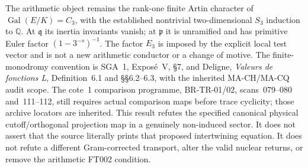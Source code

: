 The arithmetic object remains the rank-one finite
Artin character of $\operatorname{Gal}(E/K)=C_3$,
with the established nontrivial two-dimensional
$S_3$ induction to $\mathbb Q$.  At $\mathfrak q$
its inertia invariants vanish; at $\mathfrak p$
it is unramified and has primitive Euler factor
$(1-3^{-s})^{-1}$.  The factor $E_3$ is imposed by
the explicit local test vector and is not a new
arithmetic conductor or a change of motive.
The finite-monodromy convention is SGA~1,
Expos\'e~V, \S7, and Deligne, \emph{Valeurs de fonctions L},
Definition~6.1 and \S\S6.2--6.3, with the inherited
MA-CH/MA-CQ audit scope.  The cote~1 comparison
programme, BR-TR-01/02, scans~079--080 and~111--112,
still requires actual comparison maps before trace
cyclicity; those archive locators are inherited.
This result refutes the specified canonical physical
cutoff/orthogonal projection map in a genuinely
non-induced sector.  It does not assert that the source
literally prints that proposed intertwining equation.
It does not refute a different
Gram-corrected transport, alter the valid nuclear
returns, or remove the arithmetic FT002 condition.
